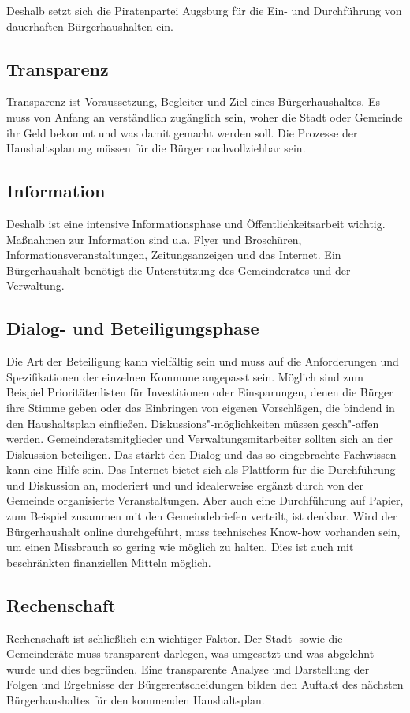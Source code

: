   Deshalb setzt sich die Piratenpartei Augsburg für die Ein- und Durchführung 
  von dauerhaften Bürgerhaushalten ein.
  
  \subsection{Transparenz}
  
  Transparenz ist Voraussetzung, Begleiter und Ziel eines Bürgerhaushaltes. Es 
  muss von Anfang an verständlich zugänglich sein, woher die Stadt oder 
  Gemeinde ihr Geld bekommt und was damit gemacht werden soll. Die Prozesse 
  der Haushaltsplanung müssen für die Bürger nachvollziehbar sein.
  
  \subsection{Information}
  
  Deshalb ist eine intensive Informationsphase und Öffentlichkeitsarbeit 
  wichtig. Maßnahmen zur Information sind u.a. Flyer und Broschüren, 
  Informationsveranstaltungen, Zeitungsanzeigen und das Internet. Ein 
  Bürgerhaushalt benötigt die Unterstützung des Gemeinderates und der 
  Verwaltung.
  
  \subsection{Dialog- und Beteiligungsphase}
  
  Die Art der Beteiligung kann vielfältig sein und muss auf die Anforderungen 
  und Spezifikationen der einzelnen Kommune angepasst sein. Möglich sind zum 
  Beispiel Prioritätenlisten für Investitionen oder Einsparungen, denen die 
  Bürger ihre Stimme geben oder das Einbringen von eigenen Vorschlägen, die 
  bindend in den Haushaltsplan einfließen. Diskussions"-möglichkeiten 
  müssen gesch"-affen werden. Gemeinderatsmitglieder und 
  Verwaltungsmitarbeiter sollten sich an der Diskussion beteiligen. Das 
  stärkt den Dialog und das so eingebrachte Fachwissen kann eine Hilfe sein. 
  Das Internet bietet sich als Plattform für die Durchführung und Diskussion 
  an, moderiert und und idealerweise ergänzt durch von der Gemeinde 
  organisierte Veranstaltungen. Aber auch eine Durchführung auf Papier, zum 
  Beispiel zusammen mit den Gemeindebriefen verteilt, ist denkbar. Wird der 
  Bürgerhaushalt online durchgeführt, muss technisches Know-how vorhanden 
  sein, um einen Missbrauch so gering wie möglich zu halten. Dies ist auch mit 
  beschränkten finanziellen Mitteln möglich.
  
  \subsection{Rechenschaft}
  
  Rechenschaft ist schließlich ein wichtiger Faktor. Der Stadt- sowie die 
  Gemeinderäte muss transparent darlegen, was umgesetzt und was abgelehnt 
  wurde und dies begründen. Eine transparente Analyse und Darstellung der 
  Folgen und Ergebnisse der Bürgerentscheidungen bilden den Auftakt des 
  nächsten Bürgerhaushaltes für den kommenden Haushaltsplan.